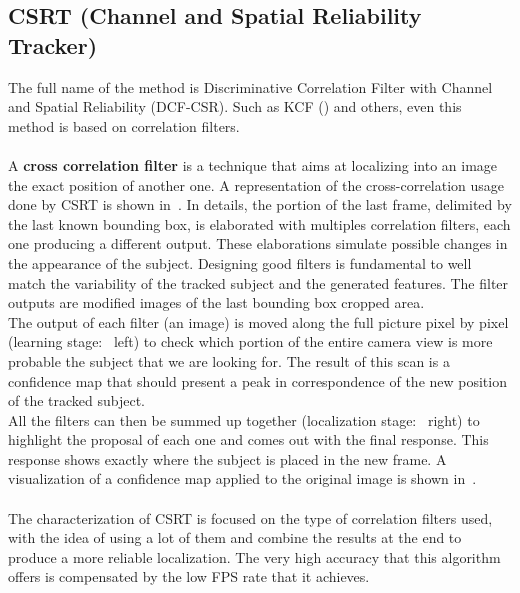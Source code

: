 \subsection{CSRT (Channel and Spatial Reliability Tracker)}
The full name of the method is Discriminative Correlation Filter with Channel and Spatial Reliability (DCF-CSR)\cite{csrt}. Such as KCF () and others, even this method is based on correlation filters.\\
\\
A \textbf{cross correlation filter} is a technique that aims at localizing into an image the exact position of another one. A representation of the cross-correlation usage done by CSRT is shown in~. In details, the portion of the last frame, delimited by the last known bounding box, is elaborated with multiples correlation filters, each one producing a different output. These elaborations simulate possible changes in the appearance of the subject. Designing good filters is fundamental to well match the variability of the tracked subject and the generated features. The filter outputs are modified images of the last bounding box cropped area.\\
The output of each filter (an image) is moved along the full picture pixel by pixel (learning stage:~ left) to check which portion of the entire camera view is more probable the subject that we are looking for. The result of this scan is a confidence map that should present a peak in correspondence of the new position of the tracked subject.\\
All the filters can then be summed up together (localization stage:~ right) to highlight the proposal of each one and comes out with the final response. This response shows exactly where the subject is placed in the new frame. A visualization of a confidence map applied to the original image is shown in~.\\
\\
The characterization of CSRT is focused on the type of correlation filters used, with the idea of using a lot of them and combine the results at the end to produce a more reliable localization. The very high accuracy that this algorithm offers is compensated by the low FPS rate that it achieves.

